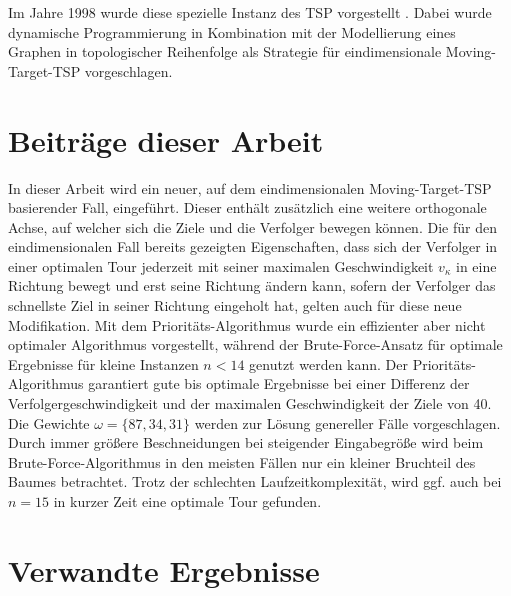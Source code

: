 \documentclass[german,version-2019-11]{uzl-thesis}
\begin{document}
Im Jahre 1998 wurde diese spezielle Instanz des TSP vorgestellt \cite{helvig}. Dabei wurde dynamische Programmierung  \cite{kunzi2013einfuhrungskursus} in Kombination mit der Modellierung eines Graphen in topologischer Reihenfolge als Strategie für eindimensionale Moving-Target-TSP vorgeschlagen.

\section{Beiträge dieser Arbeit}

In dieser Arbeit wird ein neuer, auf dem eindimensionalen Moving-Target-TSP basierender Fall, eingeführt. Dieser enthält zusätzlich eine weitere orthogonale Achse, auf welcher sich die Ziele und die Verfolger bewegen können. Die für den eindimensionalen Fall bereits gezeigten Eigenschaften, dass sich der Verfolger in einer optimalen Tour jederzeit mit seiner maximalen Geschwindigkeit $v_{\kappa}$ in eine Richtung bewegt und erst seine Richtung ändern kann, sofern der Verfolger das schnellste Ziel in seiner Richtung eingeholt hat, gelten auch für diese neue Modifikation. Mit dem Prioritäts-Algorithmus wurde ein effizienter aber nicht optimaler Algorithmus vorgestellt, während der Brute-Force-Ansatz für optimale Ergebnisse für kleine Instanzen $n<14$ genutzt werden kann. Der Prioritäts-Algorithmus garantiert gute bis optimale Ergebnisse bei einer Differenz der Verfolgergeschwindigkeit und der maximalen Geschwindigkeit der Ziele von 40. Die Gewichte $\omega=\{87,34,31\}$ werden zur Lösung genereller Fälle vorgeschlagen. Durch immer größere Beschneidungen bei steigender Eingabegröße wird beim Brute-Force-Algorithmus in den meisten Fällen nur ein kleiner Bruchteil des Baumes betrachtet. Trotz der schlechten Laufzeitkomplexität, wird ggf. auch bei $n=15$ in kurzer Zeit eine optimale Tour gefunden.


\section{Verwandte Ergebnisse}
\end{document}
